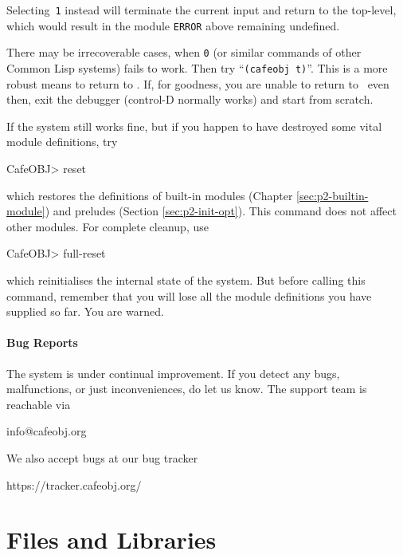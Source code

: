 \documentclass[a4paper]{memoir}
\begin{document}
Selecting~\verb|1| instead will terminate the current input and return
to the top-level, which would result in the module \verb|ERROR| above
remaining undefined.

There may be irrecoverable cases, when \verb|0| (or similar commands of
other Common Lisp systems) fails to work.
Then try ``\verb|(cafeobj t)|''. This is a more
robust means to return to \cafeobj. If, for goodness, you are unable
to return to \cafeobj~even then, exit the debugger (control-D normally
works) and start from scratch.

If the system still works fine, but if you happen to have destroyed
some vital module definitions, try
\begin{vvtm}
\begin{ccode}
  CafeOBJ> reset
\end{ccode}
\end{vvtm}
which restores the definitions of built-in modules (Chapter
\ref{sec:p2-builtin-module}) and preludes (Section \ref{sec:p2-init-opt}).
This command does not affect other modules. For complete cleanup, use
\begin{vvtm}
\begin{ccode}
  CafeOBJ> full-reset
\end{ccode}
\end{vvtm}
which reinitialises the internal state of the system. But before calling
this command, remember that
you will lose all the module definitions you have supplied so far.
You are warned.

\paragraph{Bug Reports}

The system is under continual improvement. If you detect any bugs,
malfunctions, or just inconveniences, do let us know. The support team is
reachable via
\begin{vvtm}
\begin{ccode}
  info@cafeobj.org
\end{ccode}
\end{vvtm}
We also accept bugs at our bug tracker
\begin{vvtm}
\begin{ccode}
  https://tracker.cafeobj.org/
\end{ccode}
\end{vvtm}


\section{Files and Libraries}
\end{document}
